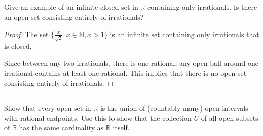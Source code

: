 \subsection{} Give an example of an infinite closed set in $\mathbb{R}$ containing only irrationals. Is there an open set consisting entirely of irrationals? 

\begin{proof}
The set $\{\frac{x}{\sqrt{2}} : x \in \mathbb{N}, x > 1\}$ is an infinite set containing only irrationals that is closed.

Since between any two irrationals, there is one rational, any open ball around one irrational contains at least one rational. This implies that there is no open set consisting entirely of irrationals.
\end{proof}


\subsection{} Show that every open set in $\mathbb{R}$ is the union of (countably many) open intervals with rational endpoints. Use this to show that the collection $U$ of all  open subsets of $\mathbb{R}$ has the same cardinality as $\mathbb{R}$ itself. 

